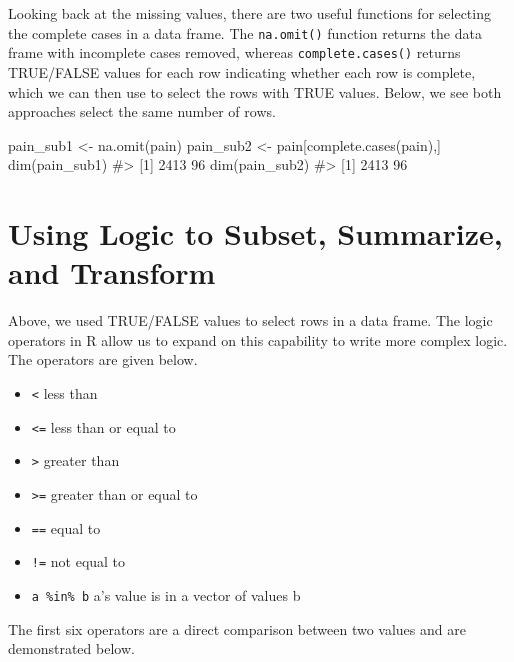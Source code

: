 \documentclass[
  letterpaper,
]{krantz}
\makeatletter
\newenvironment{Shaded}{\begin{snugshade}}{\end{snugshade}}
\newcommand{\CommentTok}[1]{\textcolor[rgb]{0.37,0.37,0.37}{#1}}
\newcommand{\FunctionTok}[1]{\textcolor[rgb]{0.28,0.35,0.67}{#1}}
\newcommand{\NormalTok}[1]{\textcolor[rgb]{0.00,0.23,0.31}{#1}}
\newcommand{\OtherTok}[1]{\textcolor[rgb]{0.00,0.23,0.31}{#1}}
\providecommand{\tightlist}{%
  \setlength{\itemsep}{0pt}\setlength{\parskip}{0pt}}\usepackage{longtable,booktabs,array}
\newenvironment{kframe}{%
\medskip{}
\setlength{\fboxsep}{.8em}
 \def\at@end@of@kframe{}%
 \ifinner\ifhmode%
  \def\at@end@of@kframe{\end{minipage}}%
  \begin{minipage}{\columnwidth}%
 \fi\fi%
 \def\FrameCommand##1{\hskip\@totalleftmargin \hskip-\fboxsep
 \colorbox{shadecolor}{##1}\hskip-\fboxsep
     \hskip-\linewidth \hskip-\@totalleftmargin \hskip\columnwidth}%
 \MakeFramed {\advance\hsize-\width
   \@totalleftmargin\z@ \linewidth\hsize
   \@setminipage}}%
 {\par\unskip\endMakeFramed%
 \at@end@of@kframe}
\renewenvironment{Shaded}{\begin{kframe}}{\end{kframe}}
\makeatother
\begin{document}
Looking back at the missing values, there are two useful functions for
selecting the complete cases in a data frame. The \texttt{na.omit()}
function returns the data frame with incomplete cases removed, whereas
\texttt{complete.cases()} returns TRUE/FALSE values for each row
indicating whether each row is complete, which we can then use to select
the rows with TRUE values. Below, we see both approaches select the same
number of rows.

\begin{Shaded}
\begin{Highlighting}[]
\NormalTok{pain\_sub1 }\OtherTok{\textless{}{-}} \FunctionTok{na.omit}\NormalTok{(pain)}
\NormalTok{pain\_sub2 }\OtherTok{\textless{}{-}}\NormalTok{ pain[}\FunctionTok{complete.cases}\NormalTok{(pain),]}
\FunctionTok{dim}\NormalTok{(pain\_sub1)}
\CommentTok{\#\textgreater{} [1] 2413   96}
\FunctionTok{dim}\NormalTok{(pain\_sub2)}
\CommentTok{\#\textgreater{} [1] 2413   96}
\end{Highlighting}
\end{Shaded}

\section{Using Logic to Subset, Summarize, and
Transform}\label{using-logic-to-subset-summarize-and-transform}

Above, we used TRUE/FALSE values to select rows in a data frame. The
logic operators in R allow us to expand on this capability to write more
complex logic. The operators are given below.

\begin{itemize}
\tightlist
\item
  \texttt{\textless{}} less than
\item
  \texttt{\textless{}=} less than or equal to
\item
  \texttt{\textgreater{}} greater than
\item
  \texttt{\textgreater{}=} greater than or equal to
\item
  \texttt{==} equal to
\item
  \texttt{!=} not equal to
\item
  \texttt{a\ \%in\%\ b} a's value is in a vector of values b
\end{itemize}

The first six operators are a direct comparison between two values and
are demonstrated below.
\end{document}
